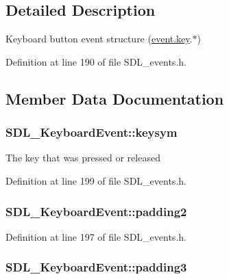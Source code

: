 \subsection{Detailed Description}
Keyboard button event structure (\hyperlink{union_s_d_l___event_ab99927835cc77a9b6bb50b419b4a27df}{event.\-key}.$\ast$) 

Definition at line 190 of file S\-D\-L\-\_\-events.\-h.



\subsection{Member Data Documentation}
\hypertarget{struct_s_d_l___keyboard_event_a2a57ba820a298f2c02ad5d41fd2b1aa8}{
\subsubsection[{keysym}]{ S\-D\-L\-\_\-\-Keyboard\-Event\-::keysym}}\label{struct_s_d_l___keyboard_event_a2a57ba820a298f2c02ad5d41fd2b1aa8}
The key that was pressed or released 

Definition at line 199 of file S\-D\-L\-\_\-events.\-h.

\hypertarget{struct_s_d_l___keyboard_event_ae270122f757f76171318294afd2c95e6}{
\subsubsection[{padding2}]{ S\-D\-L\-\_\-\-Keyboard\-Event\-::padding2}}\label{struct_s_d_l___keyboard_event_ae270122f757f76171318294afd2c95e6}


Definition at line 197 of file S\-D\-L\-\_\-events.\-h.

\hypertarget{struct_s_d_l___keyboard_event_ae1831035ef556a7b09efcd2469f26f7a}{
\subsubsection[{padding3}]{ S\-D\-L\-\_\-\-Keyboard\-Event\-::padding3}}\label{struct_s_d_l___keyboard_event_ae1831035ef556a7b09efcd2469f26f7a}


